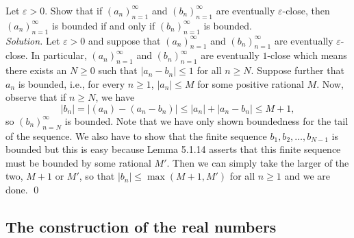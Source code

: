 \documentclass{amsart}
\theoremstyle{definition}
\newcommand{\soln}{\newline\textit{Solution.} }
\begin{document}
\subsubsection{} Let $\varepsilon>0$. Show that if $(a_n)_{n=1}^\infty$ and $(b_n)_{n=1}^\infty$ are eventually $\varepsilon$-close, then $(a_n)_{n=1}^\infty$ is bounded if and only if $(b_n)_{n=1}^\infty$ is bounded. \\
\soln Let $\varepsilon>0$ and suppose that $(a_n)_{n=1}^\infty$ and $(b_n)_{n=1}^\infty$ are eventually $\varepsilon$-close. In particular, $(a_n)_{n=1}^\infty$ and $(b_n)_{n=1}^\infty$ are eventually $1$-close which means there exists an $N\geq 0$ such that $|a_n-b_n|\leq 1$ for all $n\geq N$. Suppose further that $a_n$ is bounded, i.e., for every $n\geq 1$, $|a_n|\leq M$ for some positive rational $M$. Now, observe that if $n\geq N$, we have
\[
|b_n|=|(a_n)-(a_n-b_n)|\leq |a_n|+|a_n-b_n|\leq M+1,
\]
so $(b_n)_{n=N}^\infty$ is bounded. Note that we have only shown boundedness for the tail of the sequence. We also have to show that the finite sequence $b_1,b_2,\dots, b_{N-1}$ is bounded but this is easy because Lemma 5.1.14 asserts that this finite sequence must be bounded by some rational $M'$. Then we can simply take the larger of the two, $M+1$ or $M'$, so that $|b_n|\leq\max (M+1, M')$ for all $n\geq 1$ and we are done. \qed \\

\subsection{The construction of the real numbers} 
\end{document}
